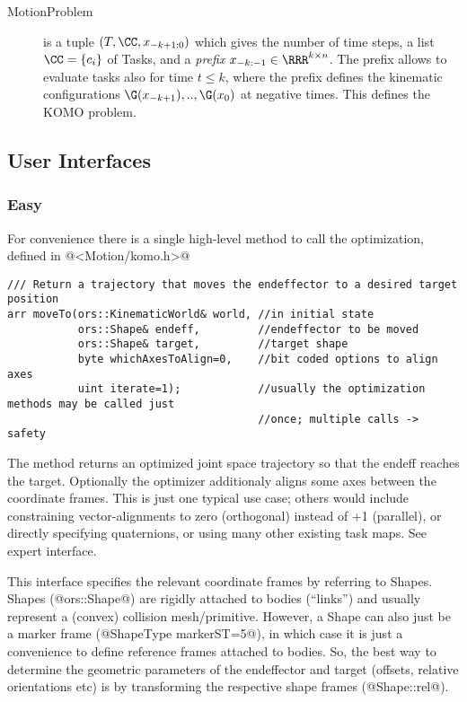 \documentclass[10pt,fleqn,twoside]{article}
\begin{document}
{{\begin{description}
\item[MotionProblem] is a tuple $(T,\CC,x_{-k+1:0})$ which gives
the number of time steps, a list $\CC=\{c_i\}$ of Tasks, and
a \emph{prefix} $x_{-k:-1} \in\RRR^{k\times n}$. The prefix allows to
evaluate tasks also for time $t\le k$, where the prefix defines the
kinematic configurations $\G(x_{-k+1}),..,\G(x_0)$ at negative
times. This defines the KOMO problem.

\end{description}




\subsection{User Interfaces}

\subsubsection{Easy}

For convenience there is a single high-level method to call the
optimization, defined in @<Motion/komo.h>@
\begin{code}
\begin{verbatim}
/// Return a trajectory that moves the endeffector to a desired target position
arr moveTo(ors::KinematicWorld& world, //in initial state
           ors::Shape& endeff,         //endeffector to be moved
           ors::Shape& target,         //target shape
           byte whichAxesToAlign=0,    //bit coded options to align axes
           uint iterate=1);            //usually the optimization methods may be called just
                                       //once; multiple calls -> safety
\end{verbatim}
\end{code}
The method returns an optimized joint space trajectory so that the
endeff reaches the target. Optionally the optimizer additionaly
aligns some axes between the coordinate frames. This is just one
typical use case; others would include constraining vector-alignments
to zero (orthogonal) instead of +1 (parallel), or directly specifying
quaternions, or using many other existing task maps. See expert
interface.

This interface specifies the relevant coordinate frames by referring
to Shapes. Shapes (@ors::Shape@) are rigidly attached to bodies
(``links'') and usually represent a (convex) collision
mesh/primitive. However, a Shape can also just be a marker frame
(@ShapeType markerST=5@), in which case it is just a convenience to
define reference frames attached to bodies. So, the best way to
determine the geometric parameters of the endeffector and target
(offsets, relative orientations etc) is by transforming the respective
shape frames (@Shape::rel@).

}}
\end{document}
